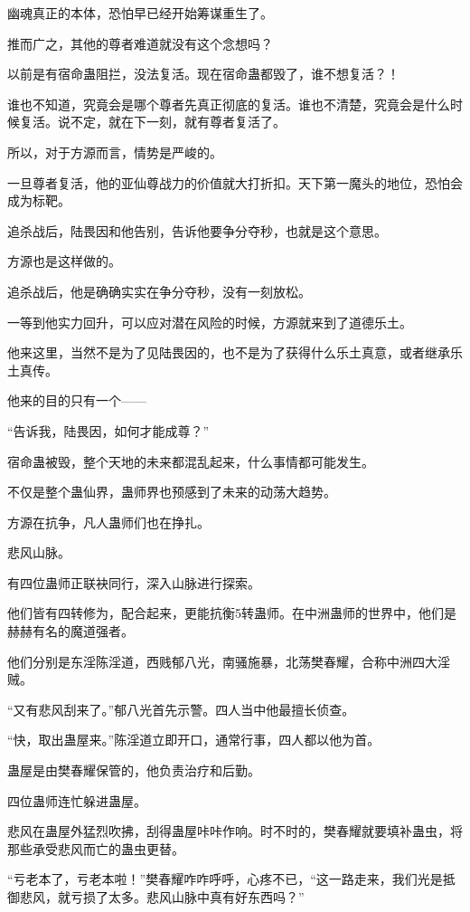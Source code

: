 \begin{this_body}
幽魂真正的本体，恐怕早已经开始筹谋重生了。

推而广之，其他的尊者难道就没有这个念想吗？

以前是有宿命蛊阻拦，没法复活。现在宿命蛊都毁了，谁不想复活？！

谁也不知道，究竟会是哪个尊者先真正彻底的复活。谁也不清楚，究竟会是什么时候复活。说不定，就在下一刻，就有尊者复活了。

所以，对于方源而言，情势是严峻的。

一旦尊者复活，他的亚仙尊战力的价值就大打折扣。天下第一魔头的地位，恐怕会成为标靶。

追杀战后，陆畏因和他告别，告诉他要争分夺秒，也就是这个意思。

方源也是这样做的。

追杀战后，他是确确实实在争分夺秒，没有一刻放松。

一等到他实力回升，可以应对潜在风险的时候，方源就来到了道德乐土。

他来这里，当然不是为了见陆畏因的，也不是为了获得什么乐土真意，或者继承乐土真传。

他来的目的只有一个——

“告诉我，陆畏因，如何才能成尊？”

宿命蛊被毁，整个天地的未来都混乱起来，什么事情都可能发生。

不仅是整个蛊仙界，蛊师界也预感到了未来的动荡大趋势。

方源在抗争，凡人蛊师们也在挣扎。

悲风山脉。

有四位蛊师正联袂同行，深入山脉进行探索。

他们皆有四转修为，配合起来，更能抗衡5转蛊师。在中洲蛊师的世界中，他们是赫赫有名的魔道强者。

他们分别是东淫陈淫道，西贱郁八光，南骚施暴，北荡樊春耀，合称中洲四大淫贼。

“又有悲风刮来了。”郁八光首先示警。四人当中他最擅长侦查。

“快，取出蛊屋来。”陈淫道立即开口，通常行事，四人都以他为首。

蛊屋是由樊春耀保管的，他负责治疗和后勤。

四位蛊师连忙躲进蛊屋。

悲风在蛊屋外猛烈吹拂，刮得蛊屋咔咔作响。时不时的，樊春耀就要填补蛊虫，将那些承受悲风而亡的蛊虫更替。

“亏老本了，亏老本啦！”樊春耀咋咋呼呼，心疼不已，“这一路走来，我们光是抵御悲风，就亏损了太多。悲风山脉中真有好东西吗？”


\end{this_body}
